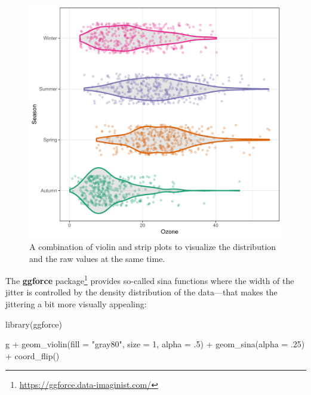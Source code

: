 \documentclass[
]{krantz}
\makeatletter
\newenvironment{Shaded}{\begin{snugshade}}{\end{snugshade}}
\newcommand{\AttributeTok}[1]{\textcolor[rgb]{0.61,0.61,0.61}{#1}}
\newcommand{\DecValTok}[1]{\textcolor[rgb]{0.06,0.06,0.06}{#1}}
\newcommand{\FunctionTok}[1]{\textcolor[rgb]{0,0,0}{#1}}
\newcommand{\NormalTok}[1]{#1}
\newcommand{\SpecialCharTok}[1]{\textcolor[rgb]{0,0,0}{#1}}
\newcommand{\StringTok}[1]{\textcolor[rgb]{0.5,0.5,0.5}{#1}}
\renewcommand{\href}[2]{#2\footnote{\url{#1}}}
\newenvironment{kframe}{%
\medskip{}
\setlength{\fboxsep}{.8em}
 \def\at@end@of@kframe{}%
 \ifinner\ifhmode%
  \def\at@end@of@kframe{\end{minipage}}%
  \begin{minipage}{\columnwidth}%
 \fi\fi%
 \def\FrameCommand##1{\hskip\@totalleftmargin \hskip-\fboxsep
 \colorbox{shadecolor}{##1}\hskip-\fboxsep
     \hskip-\linewidth \hskip-\@totalleftmargin \hskip\columnwidth}%
 \MakeFramed {\advance\hsize-\width
   \@totalleftmargin\z@ \linewidth\hsize
   \@setminipage}}%
 {\par\unskip\endMakeFramed%
 \at@end@of@kframe}
\renewenvironment{Shaded}{\begin{kframe}}{\end{kframe}}
\makeatother
\begin{document}
\begin{figure}
\centering
\includegraphics{bookdown_files/figure-latex/violin-jitter-1.pdf}
\caption{\label{fig:violin-jitter}A combination of violin and strip plots to visualize the distribution and the raw values at the same time.}
\end{figure}

The \href{https://ggforce.data-imaginist.com/}{\textbf{ggforce} package} provides so-called sina functions where the width of the jitter is controlled by the density distribution of the data---that makes the jittering a bit more visually appealing:

\begin{Shaded}
\begin{Highlighting}[]
\FunctionTok{library}\NormalTok{(ggforce)}

\NormalTok{g }\SpecialCharTok{+} \FunctionTok{geom\_violin}\NormalTok{(}\AttributeTok{fill =} \StringTok{"gray80"}\NormalTok{, }\AttributeTok{size =} \DecValTok{1}\NormalTok{, }\AttributeTok{alpha =}\NormalTok{ .}\DecValTok{5}\NormalTok{) }\SpecialCharTok{+}
    \FunctionTok{geom\_sina}\NormalTok{(}\AttributeTok{alpha =}\NormalTok{ .}\DecValTok{25}\NormalTok{) }\SpecialCharTok{+}
    \FunctionTok{coord\_flip}\NormalTok{()}
\end{Highlighting}
\end{Shaded}
\end{document}
